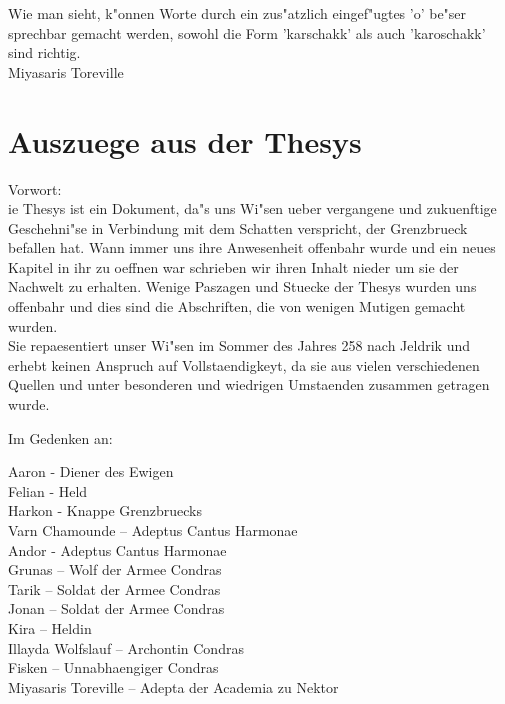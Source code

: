 \documentclass[a5paper,8pt]{book}
\begin{document}
Wie man sieht, k"onnen Worte durch ein zus"atzlich eingef"ugtes 'o' be"ser sprechbar gemacht werden, sowohl die Form 'karschakk' als auch 'karoschakk' sind richtig. \\
Miyasaris Toreville
\newpage

\section{ Auszuege aus der Thesys}

Vorwort:\\
ie Thesys ist ein Dokument, da"s uns Wi"sen ueber vergangene und zukuenftige Geschehni"se in Verbindung mit dem Schatten verspricht, der Grenzbrueck befallen hat. Wann immer uns ihre Anwesenheit offenbahr wurde und ein neues Kapitel in ihr zu oeffnen war schrieben wir ihren Inhalt nieder um sie der Nachwelt zu erhalten. Wenige Paszagen und Stuecke der Thesys wurden uns offenbahr und dies sind die Abschriften, die von wenigen Mutigen gemacht wurden.\\
Sie repaesentiert unser Wi"sen im Sommer des Jahres 258 nach Jeldrik und erhebt keinen Anspruch auf Vollstaendigkeyt, da sie aus vielen verschiedenen Quellen und unter besonderen und wiedrigen Umstaenden zusammen getragen wurde.
\newpage

\begin{center}
\begin{Huge}Im Gedenken an:\\\end{Huge}

\vspace{10mm}

Aaron - Diener des Ewigen\\
Felian - Held\\
Harkon - Knappe Grenzbruecks\\
Varn Chamounde – Adeptus Cantus Harmonae\\
Andor - Adeptus Cantus Harmonae\\
Grunas – Wolf der Armee Condras\\
Tarik – Soldat der Armee Condras\\
Jonan – Soldat der Armee Condras\\
Kira – Heldin\\
Illayda Wolfslauf – Archontin Condras\\
Fisken – Unnabhaengiger Condras\\
Miyasaris Toreville – Adepta der Academia zu Nektor\\
\end{center}
\end{document}
